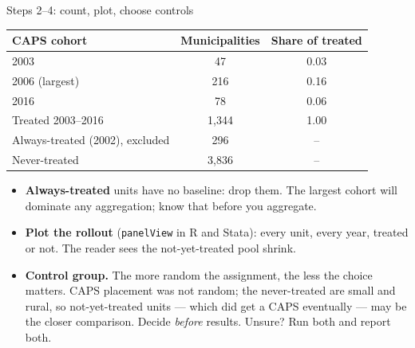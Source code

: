 \documentclass[
  11pt,
  ignorenonframetext,
  aspectratio=169,
]{beamer}
\providecommand{\tightlist}{%
  \setlength{\itemsep}{0pt}\setlength{\parskip}{0pt}}
\begin{document}
\begin{frame}[fragile]{Steps 2--4: count, plot, choose controls}
\protect{}\label{steps-24-count-plot-choose-controls}
\begin{center}\small
\begin{tabular}{lcc}
\toprule
CAPS cohort & Municipalities & Share of treated \\
\midrule
2003 & 47 & 0.03 \\
2006 (largest) & 216 & 0.16 \\
2016 & 78 & 0.06 \\
Treated 2003--2016 & 1,344 & 1.00 \\
Always-treated (2002), excluded & 296 & -- \\
Never-treated & 3,836 & -- \\
\bottomrule
\end{tabular}
\end{center}

\begin{itemize}
\tightlist
\item
  \textbf{Always-treated} units have no baseline: drop them. The largest
  cohort will dominate any aggregation; know that before you aggregate.
\item
  \textbf{Plot the rollout} (\texttt{panelView} in R and Stata): every
  unit, every year, treated or not. The reader sees the not-yet-treated
  pool shrink.
\item
  \textbf{Control group.} The more random the assignment, the less the
  choice matters. CAPS placement was not random; the never-treated are
  small and rural, so not-yet-treated units --- which did get a CAPS
  eventually --- may be the closer comparison. Decide \emph{before}
  results. Unsure? Run both and report both.
\end{itemize}
\end{frame}
\end{document}
